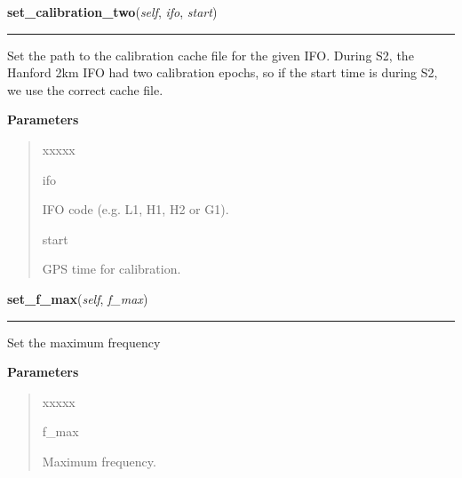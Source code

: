     \begin{boxedminipage}{\textwidth}

    \raggedright \textbf{set\_calibration\_two}(\textit{self}, \textit{ifo}, \textit{start})

    \vspace{-1.5ex}

    \rule{\textwidth}{0.5\fboxrule}
    Set the path to the calibration cache file for the given IFO. During 
    S2, the Hanford 2km IFO had two calibration epochs, so if the start 
    time is during S2, we use the correct cache file.

    \vspace{1ex}

      \textbf{Parameters}
      \begin{quote}
        \begin{Ventry}{xxxxx}

          \item[ifo]

          IFO code (e.g. L1, H1, H2 or G1).

          \item[start]

          GPS time for calibration.

        \end{Ventry}

      \end{quote}

    \vspace{1ex}

    \end{boxedminipage}

    \label{stochastic:StochasticNode:set_f_max}
    \vspace{0.5ex}

    \begin{boxedminipage}{\textwidth}

    \raggedright \textbf{set\_f\_max}(\textit{self}, \textit{f\_max})

    \vspace{-1.5ex}

    \rule{\textwidth}{0.5\fboxrule}
    Set the maximum frequency

    \vspace{1ex}

      \textbf{Parameters}
      \begin{quote}
        \begin{Ventry}{xxxxx}

          \item[f\_max]

          Maximum frequency.

        \end{Ventry}

      \end{quote}

    \vspace{1ex}

    \end{boxedminipage}

